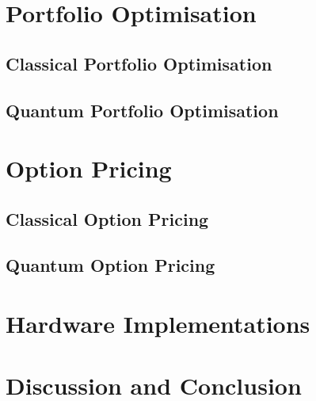 \documentclass[prx,twocolumn,floatfix,superscriptaddress,longbibliography]{revtex4-1}
\begin{document}
\section{Portfolio Optimisation}\label{sec:literature1}



\subsection{Classical Portfolio Optimisation}

\subsection{Quantum Portfolio Optimisation}


\section{Option Pricing}\label{sec:literature2}

\subsection{Classical Option Pricing}

\subsection{Quantum Option Pricing}


\section{Hardware Implementations}\label{sec:hardware}




\section{Discussion and Conclusion}\label{sec:discussion}



\FloatBarrier


\end{document}
